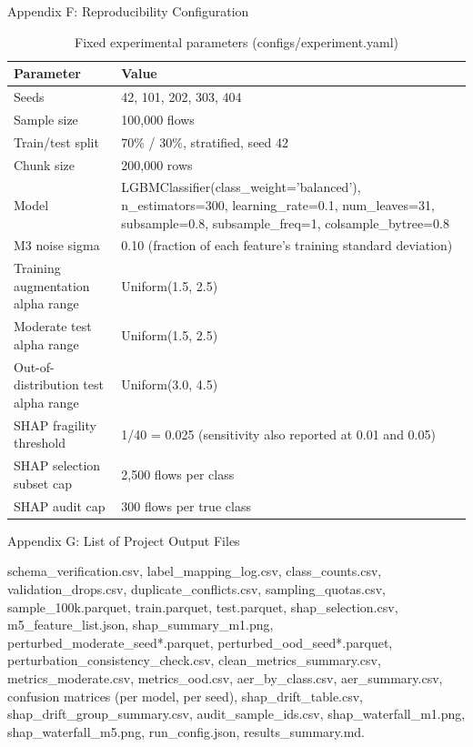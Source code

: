 \documentclass[12pt,a4paper]{report}
\begin{document}
\begin{center}Appendix F: Reproducibility Configuration\end{center}
\begin{table}[h]\centering
\caption{Fixed experimental parameters (configs/experiment.yaml)}
\begin{tabularx}{\linewidth}{XX}
\toprule
\textbf{Parameter} & \textbf{Value} \\
\midrule
Seeds & 42, 101, 202, 303, 404 \\
Sample size & 100,000 flows \\
Train/test split & 70\% / 30\%, stratified, seed 42 \\
Chunk size & 200,000 rows \\
Model & LGBMClassifier(class\_weight='balanced'), n\_estimators=300, learning\_rate=0.1, num\_leaves=31, subsample=0.8, subsample\_freq=1, colsample\_bytree=0.8 \\
M3 noise sigma & 0.10 (fraction of each feature's training standard deviation) \\
Training augmentation alpha range & Uniform(1.5, 2.5) \\
Moderate test alpha range & Uniform(1.5, 2.5) \\
Out-of-distribution test alpha range & Uniform(3.0, 4.5) \\
SHAP fragility threshold & 1/40 = 0.025 (sensitivity also reported at 0.01 and 0.05) \\
SHAP selection subset cap & 2,500 flows per class \\
SHAP audit cap & 300 flows per true class \\
\bottomrule
\end{tabularx}
\end{table}
\begin{center}Appendix G: List of Project Output Files\end{center}
schema\_verification.csv, label\_mapping\_log.csv, class\_counts.csv, validation\_drops.csv, duplicate\_conflicts.csv, sampling\_quotas.csv, sample\_100k.parquet, train.parquet, test.parquet, shap\_selection.csv, m5\_feature\_list.json, shap\_summary\_m1.png, perturbed\_moderate\_seed*.parquet, perturbed\_ood\_seed*.parquet, perturbation\_consistency\_check.csv, clean\_metrics\_summary.csv, metrics\_moderate.csv, metrics\_ood.csv, aer\_by\_class.csv, aer\_summary.csv, confusion matrices (per model, per seed), shap\_drift\_table.csv, shap\_drift\_group\_summary.csv, audit\_sample\_ids.csv, shap\_waterfall\_m1.png, shap\_waterfall\_m5.png, run\_config.json, results\_summary.md.
\end{document}
